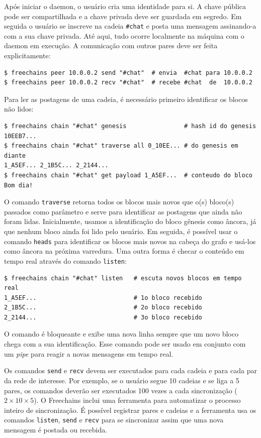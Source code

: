 \documentclass[12pt]{article}
\newcommand{\FC} {Freechains\xspace}
\begin{document}
Após iniciar o daemon, o usuário cria uma identidade para si.
A chave pública pode ser compartilhada e a chave privada deve ser guardada em
segredo.
Em seguida o usuário se inscreve na cadeia \texttt{\#chat} e posta uma mensagem
assinando-a com a sua chave privada.
Até aqui, tudo ocorre localmente na máquina com o daemon em execução.
A comunicação com outros pares deve ser feita explicitamente:
%
{\footnotesize
\begin{verbatim}
$ freechains peer 10.0.0.2 send "#chat"  # envia  #chat para 10.0.0.2
$ freechains peer 10.0.0.2 recv "#chat"  # recebe #chat  de  10.0.0.2
\end{verbatim}
}
%
Para ler as postagens de uma cadeia, é necessário primeiro identificar os
blocos não lidos:
%
{\footnotesize
\begin{verbatim}
$ freechains chain "#chat" genesis                # hash id do genesis
10EEB7...
$ freechains chain "#chat" traverse all 0_10EE... # do genesis em diante
1_A5EF... 2_1B5C... 2_2144...
$ freechains chain "#chat" get payload 1_A5EF...  # conteudo do bloco
Bom dia!
\end{verbatim}
}

O comando \texttt{traverse} retorna todos os blocos mais novos que o(s)
bloco(s) passados como parâmetro e serve para identificar as postagens que
ainda não foram lidas.
Inicialmente, usamos a identificação do bloco gênesis como âncora, já que
nenhum bloco ainda foi lido pelo usuário.
Em seguida, é possível usar o comando \texttt{heads} para identificar os blocos
mais novos na cabeça do grafo e usá-los como âncora na próxima varredura.
%
Uma outra forma é checar o conteúdo em tempo real através do comando
\texttt{listen}:
%
{\footnotesize
\begin{verbatim}
$ freechains chain "#chat" listen   # escuta novos blocos em tempo real
1_A5EF...                           # 1o bloco recebido
2_1B5C...                           # 2o bloco recebido
2_2144...                           # 3o bloco recebido
\end{verbatim}
}
%
O comando é bloqueante e exibe uma nova linha sempre que um novo bloco chega
com a sua identificação.
Esse comando pode ser usado em conjunto com um \emph{pipe} para reagir a novas
mensagens em tempo real.

Os comandos \texttt{send} e \texttt{recv} devem ser executados para cada cadeia
e para cada par da rede de interesse.
Por exemplo, se o usuário segue 10 cadeias e se liga a 5 pares, os comandos
deverão ser executados 100 vezes a cada sincronização ($2\times10\times5$).
O \FC inclui uma ferramenta para automatizar o processo inteiro de
sincronização.
É possível registrar pares e cadeias e a ferramenta usa os comandos
\texttt{listen}, \texttt{send} e \texttt{recv} para se sincronizar assim que
uma nova mensagem é postada ou recebida.
\end{document}
